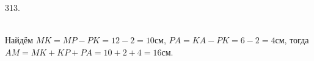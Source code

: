 313. \begin{figure}[ht!]
\end{figure}\\
Найдём $MK=MP-PK=12-2=10$см, $PA=KA-PK=6-2=4$см, тогда $AM=MK+KP+PA=10+2+4=16$см.\\
